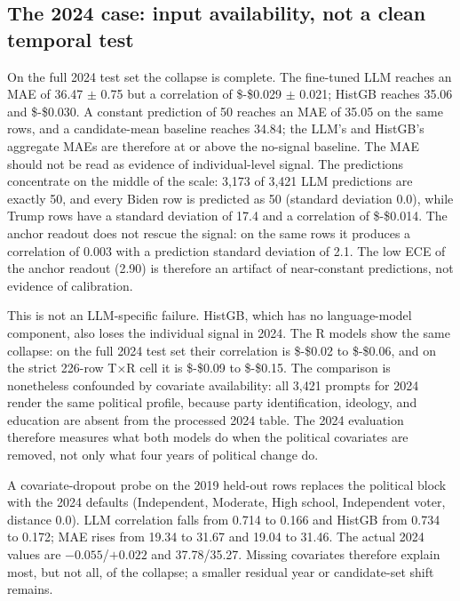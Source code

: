 \subsection{The 2024 case: input availability, not a clean temporal
test}\label{the-2024-case-input-availability-not-a-clean-temporal-test}

On the full 2024 test set the collapse is complete. The fine-tuned LLM
reaches an MAE of 36.47 \(\pm\) 0.75 but a correlation of \$-\$0.029
\(\pm\) 0.021; HistGB reaches 35.06 and \$-\$0.030. A constant
prediction of 50 reaches an MAE of 35.05 on the same rows, and a
candidate-mean baseline reaches 34.84; the LLM's and HistGB's aggregate
MAEs are therefore at or above the no-signal baseline. The MAE should
not be read as evidence of individual-level signal. The predictions
concentrate on the middle of the scale: 3,173 of 3,421 LLM predictions
are exactly 50, and every Biden row is predicted as 50 (standard
deviation 0.0), while Trump rows have a standard deviation of 17.4 and a
correlation of \$-\$0.014. The anchor readout does not rescue the
signal: on the same rows it produces a correlation of 0.003 with a
prediction standard deviation of 2.1. The low ECE of the anchor readout
(2.90) is therefore an artifact of near-constant predictions, not
evidence of calibration.

This is not an LLM-specific failure. HistGB, which has no language-model
component, also loses the individual signal in 2024. The R models show
the same collapse: on the full 2024 test set their correlation is
\$-\$0.02 to \$-\$0.06, and on the strict 226-row T×R cell it is
\$-\$0.09 to \$-\$0.15. The comparison is nonetheless confounded by
covariate availability: all 3,421 prompts for 2024 render the same
political profile, because party identification, ideology, and education
are absent from the processed 2024 table. The 2024 evaluation therefore
measures what both models do when the political covariates are removed,
not only what four years of political change do.

A covariate-dropout probe on the 2019 held-out rows replaces the
political block with the 2024 defaults (Independent, Moderate, High
school, Independent voter, distance 0.0). LLM correlation falls from
0.714 to 0.166 and HistGB from 0.734 to 0.172; MAE rises from 19.34 to
31.67 and 19.04 to 31.46. The actual 2024 values are
\(-0.055\)/\(+0.022\) and 37.78/35.27. Missing covariates therefore
explain most, but not all, of the collapse; a smaller residual year or
candidate-set shift remains.


